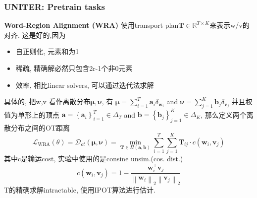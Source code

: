\documentclass{beamer}
\newcommand{\bt}[1]{\textbf{#1}}
\begin{document}
\begin{frame}
    \frametitle{UNITER: Pretrain tasks}

    \bt{Word-Region Alignment (WRA)} 
    使用transport plan$\mathbf{T} \in \mathbb{R}^{T \times K}$来表示w/v的对齐. 这是好的,因为
    \begin{itemize}
        \item 自正则化, 元素和为1
        \item 稀疏, 精确解必然只包含2r-1个非0元素
        \item 效率, 相比linear solvers, 可以通过迭代法求解
    \end{itemize}
    具体的, 把w,v 看作离散分布$\boldsymbol{\mu}, \boldsymbol{\nu}$, 有
    $\boldsymbol{\mu}=\sum_{i=1}^{T} \mathbf{a}_{i} \delta_{\mathbf{w}_{i}}$ and $\boldsymbol{\nu}=\sum_{j=1}^{K} \mathbf{b}_{j} \delta_{\mathbf{v}_{j}}$
    并且权值为单形上的顶点
    $\mathbf{a}=\left\{\mathbf{a}_{i}\right\}_{i=1}^{T} \in \Delta_{T}$ and $\mathbf{b}=\left\{\mathbf{b}_{j}\right\}_{j=1}^{K} \in \Delta_{K}$, 那么定义两个离散分布之间的OT距离
    \begin{equation}
        \mathcal{L}_{\mathrm{WRA}}(\theta)=\mathcal{D}_{o t}(\boldsymbol{\mu}, \boldsymbol{\nu})=\min _{\mathbf{T} \in \Pi(\mathbf{a}, \mathbf{b})} \sum_{i=1}^{T} \sum_{j=1}^{K} \mathbf{T}_{i j} \cdot c\left(\mathbf{w}_{i}, \mathbf{v}_{j}\right)
    \end{equation}
    其中c是输运cost, 实验中使用的是consine unsim.(cos. dist.) 
    \begin{equation}
        c\left(\mathbf{w}_{i}, \mathbf{v}_{j}\right)=1-\frac{\mathbf{w}_{i}^{\top} \mathbf{v}_{j}}{\left\|\mathbf{w}_{i}\right\|_{2}\left\|\mathbf{v}_{j}\right\|_{2}}
    \end{equation}
    T的精确求解intractable, 使用IPOT算法进行估计.

\end{frame}
\end{document}
